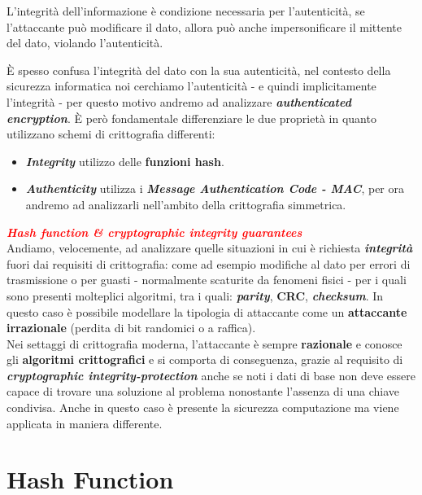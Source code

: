 \begin{flushleft}
    L'integrità dell'informazione è condizione necessaria per l'autenticità, se l'attaccante può modificare il dato, allora può anche impersonificare il mittente del dato, violando l'autenticità.

    \smallskip

    È spesso confusa l'integrità del dato con la sua autenticità, nel contesto della sicurezza informatica noi cerchiamo l'autenticità - e quindi implicitamente l'integrità - per questo motivo andremo ad analizzare \textbf{\textit{authenticated encryption}}. È però fondamentale differenziare le due proprietà in quanto utilizzano schemi di crittografia differenti:
    \begin{itemize}[nosep]
        \item \textbf{\textit{Integrity}} utilizzo delle \textbf{funzioni hash}.
        \item \textbf{\textit{Authenticity}} utilizza i \textbf{\textit{Message Authentication Code - MAC}}, per ora andremo ad analizzarli nell'ambito della crittografia simmetrica.
    \end{itemize}

    \textcolor{red}{\textbf{\textit{Hash function \& cryptographic integrity guarantees}}} \\
    Andiamo, velocemente, ad analizzare quelle situazioni in cui è richiesta \textbf{\textit{integrità}} fuori dai requisiti di crittografia: come ad esempio modifiche al dato per errori di trasmissione o per guasti - normalmente scaturite da fenomeni fisici - per i quali sono presenti molteplici algoritmi, tra i quali: \textbf{\textit{parity}}, \textbf{CRC}, \textbf{\textit{checksum}}. In questo caso è possibile modellare la tipologia di attaccante come un \textbf{attaccante irrazionale} (perdita di bit randomici o a raffica). \\
    Nei settaggi di crittografia moderna, l'attaccante è sempre \textbf{razionale} e conosce gli \textbf{algoritmi crittografici} e si comporta di conseguenza, grazie al requisito di \textbf{\textit{cryptographic integrity-protection}} anche se noti i dati di base non deve essere capace di trovare una soluzione al problema nonostante l'assenza di una chiave condivisa. Anche in questo caso è presente la sicurezza computazione ma viene applicata in maniera differente.

\end{flushleft}

\section{Hash Function}

